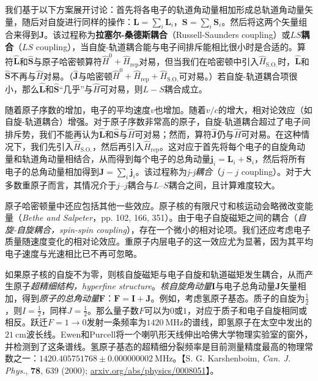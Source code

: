     我们基于以下方案展开讨论：首先将各电子的轨道角动量相加形成总轨道角动量矢量，随后对自旋进行同样的操作：$\mathbf{L} = \sum_i \mathbf{L}_i$，$\mathbf{S} = \sum_i \mathbf{S}_i$。然后将这两个矢量组合来得到$\mathbf{J}$。该过程称为\textbf{拉塞尔-桑德斯耦合}（Russell-Saunders coupling）或\textbf{$LS$耦合}（$LS$ coupling），当自旋-轨道耦合能与电子间排斥能相比很小时是合适的。算符$\hat{\mathbf{L}}$和$\hat{\mathbf{S}}$与原子哈密顿算符$\hat{H}^0 + \hat{H}_{\text{rep}}$对易，但当我们在哈密顿中引入$\hat{H}_{\text{S.O.}}$时，$\hat{\mathbf{L}}$和$\hat{\mathbf{S}}$不再与$\hat{H}$对易。（$\hat{\mathbf{J}}$与哈密顿$\hat{H}^0 + \hat{H}_{\text{rep}} + \hat{H}_{\text{S.O.}}$可对易。）若自旋-轨道耦合项很小，那么$\hat{\mathbf{L}}$和$\hat{\mathbf{S}}$“几乎”与$\hat{H}$可对易，则$L-S$耦合成立。

    随着原子序数的增加，电子的平均速度$v$也增加。随着$v/c$的增大，相对论效应（如自旋-轨道耦合）增强。对于原子序数非常高的原子，自旋-轨道耦合超过了电子间排斥势，我们不能再认为$\hat{\mathbf{L}}$和$\hat{\mathbf{S}}$与$\hat{H}$可对易；然而，算符$\hat{\mathbf{J}}$仍与$\hat{H}$可对易。在这种情况下，我们先引入$\hat{H}_{\text{S.O.}}$，然后再引入$\hat{H}_{\text{rep}}$。这对应于首先将每个电子的自旋角动量和轨道角动量相结合，从而得到每个电子的总角动量$\mathbf{j}_i = \mathbf{L}_i + \mathbf{S}_i$，然后将所有电子的总角动量相加得到$\mathbf{J} = \sum_i \mathbf{j}_i$。该过程称为\textit{j-j耦合}（$j-j$ coupling）。对于大多数重原子而言，其情况介于$j–j$耦合与$L–S$耦合之间，且计算难度较大。

    原子哈密顿量中还应包括其他一些效应。原子核的有限尺寸和核运动会略微改变能量（\textit{Bethe and Salpeter}，pp. 102, 166, 351）。由于电子自旋磁矩之间的耦合（\textit{自旋-自旋耦合，spin-spin coupling}），存在一个微小的相对论项。我们还应考虑电子质量随速度变化的相对论效应。重原子内层电子的这一效应尤为显著，因为其平均电子速度与光速相比已不再可忽略。

    如果原子核的自旋不为零，则核自旋磁矩与电子自旋和轨道磁矩发生耦合，从而产生原子\textit{超精细结构，hyperfine structure}。\textit{核自旋角动量}$\mathbf{I}$与电子总角动量$\mathbf{J}$矢量相加，得到\textit{原子的总角动量}$\mathbf{F}$：$\mathbf{F} = \mathbf{I} + \mathbf{J}$。例如，考虑氢原子基态。质子的自旋为$\frac{1}{2}$，则$I = \frac{1}{2}$，同样$J = \frac{1}{2}$。那么量子数$F$可以为$0$或$1$，对应于质子和电子自旋相同或相反。跃迁$F = 1 \to 0$发射一条频率为$1420 \:\mathrm{MHz}$的谱线，即氢原子在太空中发出的$21\:\mathrm{cm}$波长线。Ewen和Purcell将一个喇叭形天线伸出哈佛大学物理实验室的窗外，并检测到了这条谱线。氢原子基态的超精细分裂频率是目前测量精度最高的物理常数之一：$1420.405751768 \pm 0.000000002 \: \mathrm{MHz}$。【S. G. Karshenboim, \textit{Can. J. Phys.}, \textbf{78}, 639 (2000); \url{arxiv.org/abs/physics/0008051}】。

